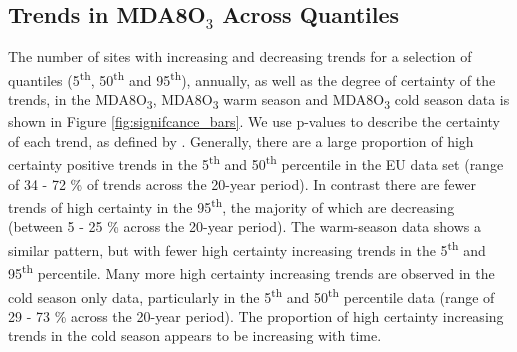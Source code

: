 \documentclass[journal abbreviation, manuscript]{copernicus}
\begin{document}

\subsection{Trends in MDA8O$_3$ Across Quantiles} \label{sect:new_mda8_trends}

The number of sites with increasing and decreasing trends for a selection of quantiles (5\textsuperscript{th}, 50\textsuperscript{th} and 95\textsuperscript{th}), annually, as well as the degree of certainty of the trends, in the MDA8O\textsubscript{3}, MDA8O\textsubscript{3} warm season and MDA8O\textsubscript{3} cold season data is shown in Figure \ref{fig:signifcance_bars}. We use p-values to describe the certainty of each trend, as defined by \cite{chang2023guidancenotebeststatistical}.
Generally, there are a large proportion of high certainty positive trends in the 5\textsuperscript{th} and 50\textsuperscript{th} percentile in the EU data set (range of 34 - 72 \% of trends across the 20-year period). In contrast there are fewer trends of high certainty in the 95\textsuperscript{th}, the majority of which are decreasing (between 5 - 25 \% across the 20-year period). The warm-season data shows a similar pattern, but with fewer high certainty increasing trends in the 5\textsuperscript{th} and 95\textsuperscript{th} percentile. Many more high certainty increasing trends are observed in the cold season only data, particularly in the 5\textsuperscript{th} and 50\textsuperscript{th} percentile data (range of 29 - 73 \% across the 20-year period). The proportion of high certainty increasing trends in the cold season appears to be increasing with time.
\end{document}
